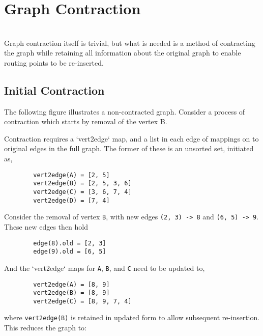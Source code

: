 \section{Graph Contraction}\\

    \noindent Graph contraction itself is trivial, but what is needed is a method of contracting the graph while retaining all information about
    the original graph to enable routing points to be re-inserted.

    \vspace{12pt}\subsection{Initial Contraction}
    \noindent The following figure illustrates a non-contracted graph. Consider a process of contraction which starts by removal of the vertex B.

    

    \noindent Contraction requires a `vert2edge` map, and a list in each edge of mappings on to original edges in the full graph. The former of
    these is an unsorted set, initiated as,
    \begin{lstlisting}
        vert2edge(A) = [2, 5]
        vert2edge(B) = [2, 5, 3, 6]
        vert2edge(C) = [3, 6, 7, 4]
        vert2edge(D) = [7, 4]
    \end{lstlisting}
    Consider the removal of vertex {\tt B}, with new edges {\tt(2, 3) -> 8} and {\tt(6, 5) -> 9}. These new edges then hold
    \begin{lstlisting}
        edge(8).old = [2, 3]
        edge(9).old = [6, 5]
    \end{lstlisting}
    And the `vert2edge` maps for {\tt A}, {\tt B}, and {\tt C} need to be updated to,
    \begin{lstlisting}
        vert2edge(A) = [8, 9]
        vert2edge(B) = [8, 9]
        vert2edge(C) = [8, 9, 7, 4]
    \end{lstlisting}
    where {\tt vert2edge(B)} is retained in updated form to allow subsequent re-insertion.  This reduces the graph to:
    \pagebreak

    

